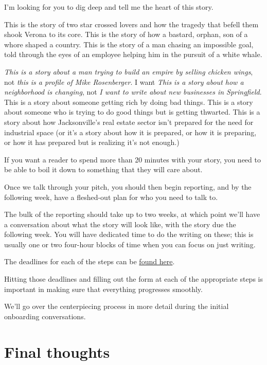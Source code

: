 \documentclass[
  11pt,
  american,
  letterpaperpaper,
  extrafontsizes,onecolumn,openright
  ]{memoir}
\begin{document}
I'm looking for you to dig deep and tell me the heart of this story.

This is the story of two star crossed lovers and how the tragedy that befell them shook Verona to its core. This is the story of how a bastard, orphan, son of a whore shaped a country. This is the story of a man chasing an impossible goal, told through the eyes of an employee helping him in the pursuit of a white whale.

\emph{This is a story about a man trying to build an empire by selling chicken wings}, not \emph{this is a profile of Mike Rosenberger}. I want \emph{This is a story about how a neighborhood is changing}, not \emph{I want to write about new businesses in Springfield}. This is a story about someone getting rich by doing bad things. This is a story about someone who is trying to do good things but is getting thwarted. This is a story about how Jacksonville's real estate sector isn't prepared for the need for industrial space (or it's a story about how it is prepared, or how it is preparing, or how it has prepared but is realizing it's not enough.)

If you want a reader to spend more than 20 minutes with your story, you need to be able to boil it down to something that they will care about.

Once we talk through your pitch, you should then begin reporting, and by the following week, have a fleshed-out plan for who you need to talk to.

The bulk of the reporting should take up to two weeks, at which point we'll have a conversation about what the story will look like, with the story due the following week. You will have dedicated time to do the writing on these; this is usually one or two four-hour blocks of time when you can focus on just writing.

The deadlines for each of the steps can be \href{https://bizj.us/1qk3ql}{found here}.

Hitting those deadlines and filling out the form at each of the appropriate steps is important in making sure that everything progresses smoothly.

\leavevmode{}%
\begin{greybox}[frametitle=Onboarding Path]
We'll go over the centerpiecing process in more detail during the initial onboarding conversations.

\end{greybox}

\hypertarget{final-thoughts-5}{%
\section*{Final thoughts}\label{final-thoughts-5}}
\end{document}
